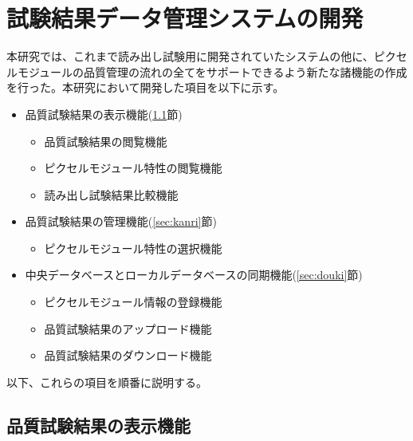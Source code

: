 \chapter{試験結果データ管理システムの開発}
\label{sec:chap7}

本研究では、これまで読み出し試験用に開発されていたシステムの他に、ピクセルモジュールの品質管理の流れの全てをサポートできるよう新たな諸機能の作成を行った。本研究において開発した項目を以下に示す。
\begin{itemize}
  \item[1.] 品質試験結果の表示機能(\ref{sec:hyouji}節)
  \begin{itemize}
    \item 品質試験結果の閲覧機能
    \item ピクセルモジュール特性の閲覧機能
    \item 読み出し試験結果比較機能
  \end{itemize}
  \item[2.] 品質試験結果の管理機能(\ref{sec:kanri}節)
  \begin{itemize}
    \item ピクセルモジュール特性の選択機能
  \end{itemize}
  \item[3.] 中央データベースとローカルデータベースの同期機能(\ref{sec:douki}節)
  \begin{itemize}
    \item ピクセルモジュール情報の登録機能
    \item 品質試験結果のアップロード機能
    \item 品質試験結果のダウンロード機能
  \end{itemize}
\end{itemize}

以下、これらの項目を順番に説明する。

\section{品質試験結果の表示機能}
\label{sec:hyouji}

